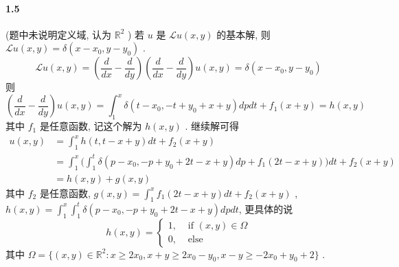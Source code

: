 \documentclass[a4paper, UTF8]{ctexart}				%
\begin{document}
    \paragraph{1.5}\quad 
        (题中未说明定义域, 认为 $\mathbb{R}^2$ ) 若 $u$ 是 $\mathcal{L}u(x,y)$ 的基本解, 则 $\mathcal{L}u(x,y) = \delta(x-x_0,y-y_0)$ . 
        \[
            \mathcal{L}u(x,y) = (\frac{d}{dx} - \frac{d}{dy})(\frac{d}{dx} - \frac{d}{dy})u(x,y) = \delta(x-x_0,y-y_0)
        \]
        则 
        \[
            (\frac{d}{dx} - \frac{d}{dy})u(x,y) = \int^{x}_{1} \delta(t-x_0, -t+y_0+x+y) dp dt + f_1(x+y) = h(x,y)
        \]
        其中 $f_1$ 是任意函数, 记这个解为 $h(x,y)$ . 继续解可得
        \[
            \begin{split}
                u(x,y)
                & = \int^{x}_{1} h(t, t-x+y) dt + f_2(x+y)\\
                & = \int^{x}_{1} \biggl(\int^{t}_{1} \delta(p-x_0, -p+y_0+2t-x+y) dp + f_1(2t-x+y)\biggl) dt + f_2(x+y)\\
                & = h(x,y) + g(x,y)
            \end{split}
        \]
        其中 $f_2$ 是任意函数, $g(x,y) = \int^{x}_{1} f_1(2t-x+y) dt + f_2(x+y)$ , $h(x,y) = \int^{x}_{1} \int^{t}_{1} \delta(p-x_0, -p+y_0+2t-x+y) dp dt$, 更具体的说 
        \[
            h(x,y) =
            \begin{cases}
                1, &\text{ if }(x,y) \in \Omega\\
                0, &\text{ else}
            \end{cases} 
        \]
        其中 $\Omega = \{(x,y)\in \mathbb{R}^2:x \ge 2x_0, x+y \ge 2x_0 -y_0, x-y \ge -2x_0 + y_0 + 2\}$ . 
        
\end{document}
